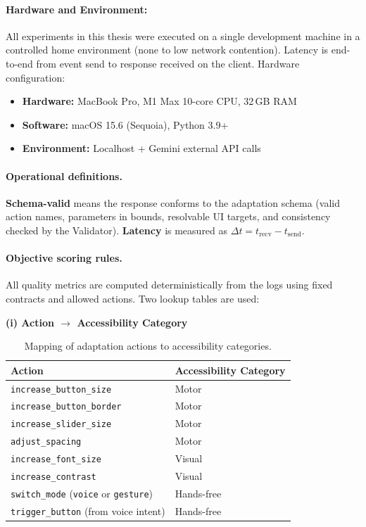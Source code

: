 \documentclass[openany]{book}
\begin{document}
\paragraph{Hardware and Environment:}
All experiments in this thesis were executed on a single development machine in a controlled home environment (none to low network contention). Latency is end-to-end from event send to response received on the client.
Hardware configuration:
\begin{itemize}
    \item \textbf{Hardware:} MacBook Pro, M1 Max 10-core CPU, 32\,GB RAM
    \item \textbf{Software:} macOS 15.6 (Sequoia), Python 3.9+
    \item \textbf{Environment:} Localhost + Gemini external API calls
\end{itemize}

\paragraph{Operational definitions.}
\textbf{Schema-valid} means the response conforms to the adaptation schema (valid action names, parameters in bounds, resolvable UI targets, and consistency checked by the Validator). \textbf{Latency} is measured as $\Delta t = t_{\text{recv}} - t_{\text{send}}$.

\paragraph{Objective scoring rules.}
All quality metrics are computed deterministically from the logs using fixed contracts and allowed actions. Two lookup tables are used:

\noindent\textbf{(i) Action $\rightarrow$ Accessibility Category}

\begin{table}[H]
\centering
\small
\renewcommand{\arraystretch}{1.3}
\caption{Mapping of adaptation actions to accessibility categories.}
\begin{tabular}{ll}
\toprule
\textbf{Action} & \textbf{Accessibility Category} \\
\midrule
\texttt{increase\_button\_size}      & Motor \\
\texttt{increase\_button\_border}    & Motor \\
\texttt{increase\_slider\_size}      & Motor \\
\texttt{adjust\_spacing}             & Motor \\
\texttt{increase\_font\_size}        & Visual \\
\texttt{increase\_contrast}          & Visual \\
\texttt{switch\_mode} (\texttt{voice} or \texttt{gesture}) & Hands-free \\
\texttt{trigger\_button} (from voice intent) & Hands-free \\
\bottomrule
\end{tabular}
\end{table}
\end{document}
